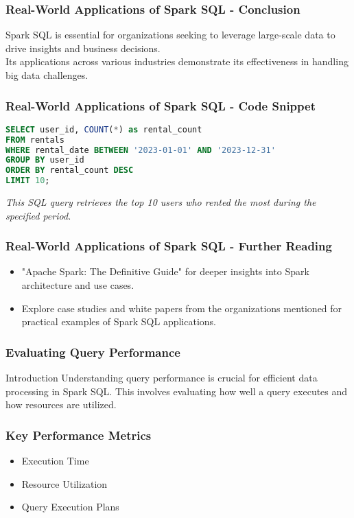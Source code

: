 \documentclass[aspectratio=169]{beamer}
\begin{document}
\begin{frame}[fragile]
    \frametitle{Real-World Applications of Spark SQL - Conclusion}
    Spark SQL is essential for organizations seeking to leverage large-scale data to drive insights and business decisions.\\
    Its applications across various industries demonstrate its effectiveness in handling big data challenges.
\end{frame}

\begin{frame}[fragile]
    \frametitle{Real-World Applications of Spark SQL - Code Snippet}
    \begin{lstlisting}[language=SQL]
SELECT user_id, COUNT(*) as rental_count 
FROM rentals 
WHERE rental_date BETWEEN '2023-01-01' AND '2023-12-31' 
GROUP BY user_id 
ORDER BY rental_count DESC 
LIMIT 10;
    \end{lstlisting}
    \textit{This SQL query retrieves the top 10 users who rented the most during the specified period.}
\end{frame}

\begin{frame}[fragile]
    \frametitle{Real-World Applications of Spark SQL - Further Reading}
    \begin{itemize}
        \item "Apache Spark: The Definitive Guide" for deeper insights into Spark architecture and use cases.
        \item Explore case studies and white papers from the organizations mentioned for practical examples of Spark SQL applications.
    \end{itemize}
\end{frame}

\begin{frame}[fragile]
    \frametitle{Evaluating Query Performance}
    \begin{block}{Introduction}
        Understanding query performance is crucial for efficient data processing in Spark SQL. 
        This involves evaluating how well a query executes and how resources are utilized.
    \end{block}
\end{frame}

\begin{frame}[fragile]
    \frametitle{Key Performance Metrics}
    \begin{itemize}
        \item Execution Time
        \item Resource Utilization
        \item Query Execution Plans
    \end{itemize}
\end{frame}
\end{document}

